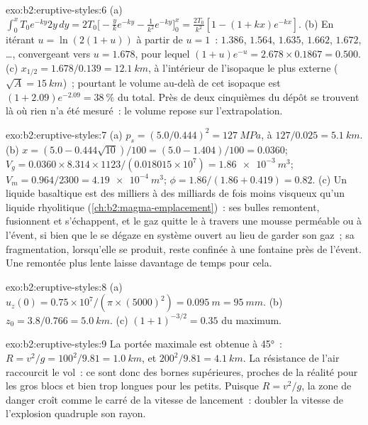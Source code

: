 \begin{solution}{exo:b2:eruptive-styles:6}
(a) $\int_0^x T_0e^{-ky}2y\,dy = 2T_0\big[-\tfrac{y}{k}e^{-ky} - \tfrac{1}{k^2}e^{-ky}\big]_0^x
= \tfrac{2T_0}{k^2}[1 - (1 + kx)e^{-kx}]$. (b) En itérant $u = \ln(2(1 + u))$ à partir de
$u = 1$~: $1.386$, $1.564$, $1.635$, $1.662$, $1.672$, \dots, convergeant vers
$u = 1.678$, pour lequel $(1 + u)e^{-u} = 2.678\times0.1867 = 0.500$. (c) $x_{1/2} =
1.678/0.139 = \qty{12.1}{km}$, à l'intérieur de l'isopaque le plus externe ($\sqrt A =
\qty{15}{km}$)~; pourtant le volume au-delà de cet isopaque est $(1 + 2.09)e^{-2.09} =
\qty{38}{\percent}$ du total. Près de deux cinquièmes du dépôt se trouvent là où
rien n'a été mesuré~: le volume repose sur l'extrapolation.
\end{solution}

\begin{solution}{exo:b2:eruptive-styles:7}
(a) $p_s = (5.0/0.444)^2 = \qty{127}{MPa}$, à $127/0.025 = \qty{5.1}{km}$.
(b) $x = (5.0 - 0.444\sqrt{10})/100 = (5.0 - 1.404)/100 = 0.0360$;
$V_g = 0.0360\times8.314\times1123/(0.018015\times10^7) = \qty{1.86e-3}{m^3}$;
$V_m = 0.964/2300 = \qty{4.19e-4}{m^3}$; $\phi = 1.86/(1.86 + 0.419) = 0.82$.
(c) Un liquide basaltique est des milliers à des milliards de fois moins visqueux qu'un
liquide rhyolitique (\cref{ch:b2:magma-emplacement})~: ses bulles remontent,
fusionnent et s'échappent, et le gaz quitte le  à travers une mousse perméable ou à l'évent,
si bien que le  se dégaze en système ouvert au lieu de garder son gaz~; sa
fragmentation, lorsqu'elle se produit, reste confinée à une fontaine près de l'évent. Une
remontée plus lente laisse davantage de temps pour cela.
\end{solution}

\begin{solution}{exo:b2:eruptive-styles:8}
(a) $u_z(0) = 0.75\times10^7/(\pi\times(5000)^2) = \qty{0.095}{m} = \qty{95}{mm}$.
(b) $z_0 = 3.8/0.766 = \qty{5.0}{km}$. (c) $(1 + 1)^{-3/2} = 0.35$ du
maximum.
\end{solution}

\begin{solution}{exo:b2:eruptive-styles:9}
La portée maximale est obtenue à \ang{45}~: $R = v^2/g = 100^2/9.81 = \qty{1.0}{km}$, et
$200^2/9.81 = \qty{4.1}{km}$. La résistance de l'air raccourcit le vol~: ce sont donc
des bornes supérieures, proches de la réalité pour les gros blocs et bien trop longues pour les petits.
Puisque $R = v^2/g$, la zone de danger croît comme le carré de la vitesse de lancement~:
doubler la vitesse de l'explosion quadruple son rayon.
\end{solution}

